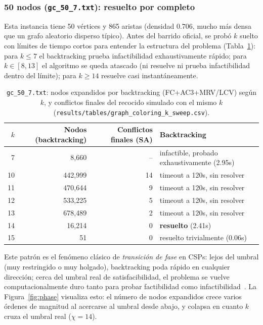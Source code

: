 \documentclass[11pt,onecolumn,letterpaper]{article}
\newcommand{\code}[1]{\texttt{#1}}
\begin{document}
\subsubsection{50 nodos (\code{gc\_50\_7.txt}): resuelto por completo}

Esta instancia tiene 50 v\'ertices y 865 aristas (densidad 0.706, mucho m\'as densa que un
grafo aleatorio disperso t\'ipico). Antes del barrido oficial, se prob\'o $k$ suelto con
l\'imites de tiempo cortos para entender la estructura del problema (Tabla~\ref{tab:phase}):
para $k\le 7$ el backtracking prueba infactibilidad exhaustivamente r\'apido; para
$k\in[8,13]$ el algoritmo se queda atascado (ni resuelve ni prueba infactibilidad dentro
del l\'imite); para $k\ge14$ resuelve casi instant\'aneamente.

\begin{table}[H]
\centering
\small
\caption{\code{gc\_50\_7.txt}: nodos expandidos por backtracking (FC+AC3+MRV/LCV) seg\'un
$k$, y conflictos finales del recocido simulado con el mismo $k$
(\code{results/tables/graph\_coloring\_k\_sweep.csv}).}
\label{tab:phase}
\begin{tabular}{@{}rrrl@{}}
\toprule
$k$ & Nodos (backtracking) & Conflictos finales (SA) & Backtracking \\
\midrule
7  & 8{,}660   & --  & infactible, probado exhaustivamente (2.95s) \\
10 & 442{,}999 & 14  & timeout a 120s, sin resolver \\
11 & 470{,}644 & 9   & timeout a 120s, sin resolver \\
12 & 533{,}225 & 5   & timeout a 120s, sin resolver \\
13 & 678{,}489 & 2   & timeout a 120s, sin resolver \\
14 & 16{,}214  & 0   & \textbf{resuelto} (2.41s) \\
15 & 51        & 0   & resuelto trivialmente (0.06s) \\
\bottomrule
\end{tabular}
\end{table}

Este patr\'on es el fen\'omeno cl\'asico de \emph{transici\'on de fase} en CSPs: lejos del
umbral (muy restringido o muy holgado), backtracking poda r\'apido en cualquier direcci\'on;
cerca del umbral real de satisfacibilidad, el problema se vuelve computacionalmente duro
tanto para probar factibilidad como infactibilidad~\cite{cheeseman1991hard}. La
Figura~\ref{fig:phase} visualiza esto: el n\'umero de nodos expandidos crece varios
\'ordenes de magnitud al acercarse al umbral desde abajo, y colapsa en cuanto $k$ cruza el
umbral real ($\chi=14$).
\end{document}
